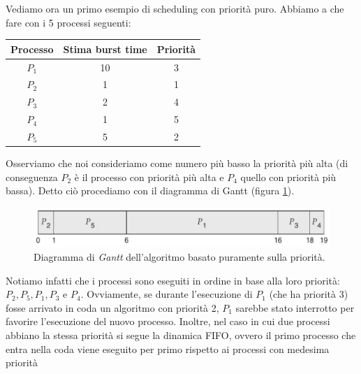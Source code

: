 Vediamo ora un primo esempio di scheduling con priorità puro. Abbiamo a che fare con i 5 processi seguenti:
\begin{table}[h]
    \centering
    \begin{tabular}{c c c}
        \textbf{Processo} & \textbf{Stima burst time} & \textbf{Priorità} \\\hline
        $P_1$ & 10 & 3 \\
        $P_2$ & 1 & 1 \\
        $P_3$ & 2 & 4 \\
        $P_4$ & 1 & 5 \\
        $P_5$ & 5 & 2 \\\hline
    \end{tabular}
\end{table}

\noindent Osserviamo che noi consideriamo come numero più basso la priorità più alta (di conseguenza $P_2$ è il processo con priorità più alta e $P_4$ quello con priorità più bassa). Detto ciò procediamo con il diagramma di Gantt (figura \ref{fig:priority_scheduling}).
\begin{figure}[h]
    \centering
    \includegraphics[width = .75\textwidth]{../res/imgs/CPU scheduling/priority_scheduling.png}
    \caption{Diagramma di \textit{Gantt} dell'algoritmo basato puramente sulla priorità.}
    \label{fig:priority_scheduling}
\end{figure}
Notiamo infatti che i processi sono eseguiti in ordine in base alla loro priorità: $P_2, P_5, P_1, P_3$ e $P_4$. Ovviamente, se durante l'esecuzione di $P_1$ (che ha priorità 3) fosse arrivato in coda un algoritmo con priorità 2, $P_1$ sarebbe stato interrotto per favorire l'esecuzione del nuovo processo. Inoltre, nel caso in cui due processi abbiano la stessa priorità si segue la dinamica FIFO, ovvero il primo processo che entra nella coda viene eseguito per primo rispetto ai processi con medesima priorità

% 
